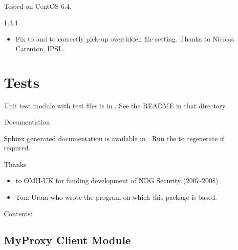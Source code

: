 \documentclass[letterpaper,10pt,english]{sphinxmanual}
\begin{document}
Tested on CentOS 6.4.

1.3.1
\begin{itemize}
\item {} 
Fix to  and 
to correctly pick-up overridden file setting.  Thanks to Nicolas Carenton,
IPSL.

\end{itemize}


\chapter{Tests}
\label{README:tests}
Unit test module with test files is in .  See the README in that
directory.

Documentation

Sphinx generated documentation is available in .  Run the
 to regenerate if required.

Thanks
\begin{itemize}
\item {} 
to OMII-UK for funding development of NDG Security (2007-2008)

\item {} 
Tom Uram who wrote the  program on which this package is
based.

\end{itemize}

Contents:


\section{MyProxy Client Module}
\label{client:myproxy-client-module}\label{client::doc}
\end{document}
